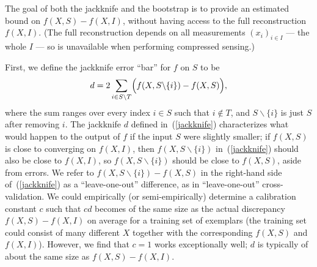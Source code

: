 \documentclass{article}
\begin{document}
The goal of both the jackknife and the bootstrap is to provide an estimated
bound on $f(X, S) - f(X, I)$, without having access to the full reconstruction
$f(X, I)$. (The full reconstruction depends on all measurements
$(x_i)_{i \in I}$ --- the whole $I$ --- so is unavailable when performing
compressed sensing.)

First, we define the jackknife error ``bar'' for $f$ on $S$ to be
%
\begin{equation}
\label{jackknife}
d = 2 \sum_{i \in S \backslash T}
    \Bigl( f(X, S \backslash \{i\}) - f(X, S) \Bigr),
\end{equation}
%
where the sum ranges over every index $i \in S$ such that $i \notin T$,
and $S \backslash \{i\}$ is just $S$ after removing $i$.
The jackknife $d$ defined in~(\ref{jackknife}) characterizes
what would happen to the output of $f$ if the input $S$ were slightly smaller;
if $f(X, S)$ is close to converging on $f(X, I)$,
then $f(X, S \backslash \{i\})$ in~(\ref{jackknife}) should also be close
to $f(X, I)$, so $f(X, S \backslash \{i\})$ should be close to $f(X, S)$,
aside from errors.
We refer to $f(X, S \backslash \{i\}) - f(X, S)$ in the right-hand side
of~(\ref{jackknife}) as a ``leave-one-out'' difference,
as in ``leave-one-out'' cross-validation.
We could empirically (or semi-empirically) determine a calibration constant $c$
such that $cd$ becomes of the same size as the actual discrepancy
$f(X, S) - f(X, I)$ on average for a training set of exemplars
(the training set could consist of many different $X$ together
with the corresponding $f(X, S)$ and $f(X,I)$).
However, we find that $c = 1$ works exceptionally well;
$d$ is typically of about the same size as $f(X, S) - f(X, I)$.
\end{document}

